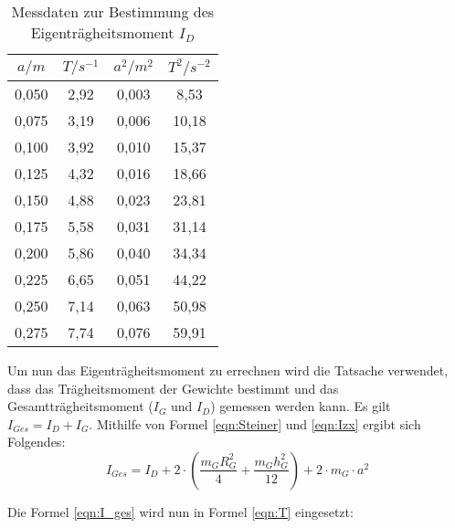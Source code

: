 \begin{table}
  \centering
  \caption{Messdaten zur Bestimmung des Eigenträgheitsmoment $I_D$}
  \label{tab:eigentrmom}
  \begin{tabular}{c c c c}
    \toprule
    $a/m$ & $T/s^{-1}$ & $a^2/m^2$ & $T^2/s^{-2}$ \\
    \midrule
    0,050 & 2,92 & 0,003 & 8,53 \\
    0,075 & 3,19 & 0,006 & 10,18 \\
    0,100 & 3,92 & 0,010 & 15,37 \\
    0,125 & 4,32 & 0,016 & 18,66 \\
    0,150 & 4,88 & 0,023 & 23,81 \\
    0,175 & 5,58 & 0,031 & 31,14 \\
    0,200 & 5,86 & 0,040 & 34,34 \\
    0,225 & 6,65 & 0,051 & 44,22 \\
    0,250 & 7,14 & 0,063 & 50,98 \\
    0,275 & 7,74 & 0,076 & 59,91 \\
    \bottomrule
  \end{tabular}
\end{table}

Um nun das Eigenträgheitsmoment zu errechnen wird die Tatsache verwendet, dass das Trägheitsmoment der Gewichte bestimmt und
das Gesamtträgheitsmoment ($I_G$ und $I_D$) gemessen werden kann. Es gilt $I_{Ges} = I_D + I_G$. Mithilfe von Formel \ref{eqn:Steiner} und \autoref{eqn:Izx} ergibt sich Folgendes:
\begin{equation}
  \label{eqn:I_ges}
    I_{Ges} = I_D + 2 \cdot \left(\frac{m_G R_G^2}{4} + \frac{m_G h_G^2}{12} \right) + 2 \cdot m_G \cdot a^2
\end{equation}

Die Formel \ref{eqn:I_ges} wird nun in Formel \ref{eqn:T} eingesetzt:

